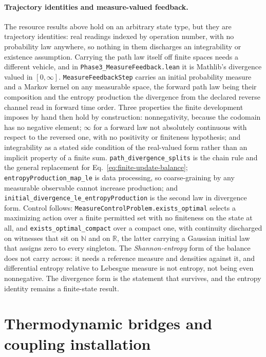 \documentclass{article}
\begin{document}
\paragraph{Trajectory identities and measure-valued feedback.}
The resource results above hold on an arbitrary state type, but they are
trajectory identities: real readings indexed by operation number, with no
probability law anywhere, so nothing in them discharges an integrability or
existence assumption. Carrying the path law itself off finite spaces needs a
different vehicle, and in \nolinkurl{Phase3_MeasureFeedback.lean} it is
Mathlib's divergence valued in $[0,\infty]$.
\texttt{MeasureFeedbackStep} carries an initial probability measure and a Markov
kernel on any measurable space, the forward path law being their composition and
the entropy production the divergence from the declared reverse channel read in
forward time order. Three properties the finite development imposes by hand then
hold by construction: nonnegativity, because the codomain has no negative
element; $\infty$ for a forward law not absolutely continuous with respect to
the reversed one, with no positivity or finiteness hypothesis; and integrability
as a stated side condition of the real-valued form rather than an implicit
property of a finite sum.
\nolinkurl{path_divergence_splits} is the chain rule and
the general replacement for Eq.~\eqref{eq:finite-update-balance};
\nolinkurl{entropyProduction_map_le} is data processing,
so coarse-graining by any measurable observable cannot increase production; and
\nolinkurl{initial_divergence_le_entropyProduction}
is the second law in divergence form. Control follows:
\nolinkurl{MeasureControlProblem.exists_optimal} selects a
maximizing action over a finite permitted set with no finiteness on the state at
all, and \nolinkurl{exists_optimal_compact} over a compact
one, with continuity discharged on witnesses that sit on $\mathbb{N}$ and on
$\mathbb{R}$, the latter carrying a Gaussian initial law that assigns zero to
every singleton. The \emph{Shannon-entropy} form of the balance does not carry
across: it needs a reference measure and densities against it, and differential
entropy relative to Lebesgue measure is not entropy, not being even nonnegative.
The divergence form is the statement that survives, and the entropy identity
remains a finite-state result.

\section{Thermodynamic bridges and coupling installation}
\label{sec:supp-bridges}
\end{document}
